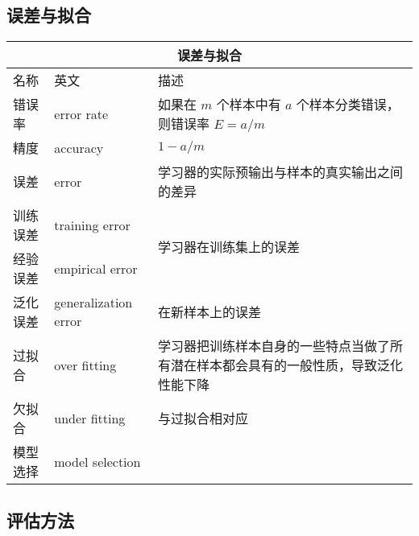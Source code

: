 \documentclass[../studies-ml.tex]{subfiles}
\begin{document}
\subsection{误差与拟合}

\begin{center}
  \begin{tabular}{ |p{3cm}||p{4cm}|p{6cm}|  }
    \hline
    \multicolumn{3}{|c|}{\textbf{误差与拟合}}                                     \\
    \hline
    名称   & 英文                   & 描述                                         \\
    \hline
    错误率  & error rate           & 如果在 $m$ 个样本中有 $a$ 个样本分类错误，则错误率 $E = a/m$   \\
    \hline
    精度   & accuracy             & $1 - a/m$                                  \\
    \hline
    误差   & error                & 学习器的实际预输出与样本的真实输出之间的差异                     \\
    \hline
    训练误差 & training error       & \multirow{2}{*}{学习器在训练集上的误差}               \\
    \cline{1-2}
    经验误差 & empirical error      &                                            \\
    \hline
    泛化误差 & generalization error & 在新样本上的误差                                   \\
    \hline
    过拟合  & over fitting         & 学习器把训练样本自身的一些特点当做了所有潜在样本都会具有的一般性质，导致泛化性能下降 \\
    \hline
    欠拟合  & under fitting        & 与过拟合相对应                                    \\
    \hline
    模型选择 & model selection      &                                            \\
    \hline
  \end{tabular}
\end{center}

\subsection{评估方法}
\end{document}
